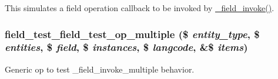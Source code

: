 This simulates a field operation callback to be invoked by \hyperlink{group__field__attach_ga65f891a5eea6513f8505f5cfc5894896}{\_\-field\_\-invoke()}. \hypertarget{field__test_8module_a9bd2f4a0811ce446841803c46aa58517}{
\subsubsection[{field\_\-test\_\-field\_\-test\_\-op\_\-multiple}]{\setlength{\rightskip}{0pt plus 5cm}field\_\-test\_\-field\_\-test\_\-op\_\-multiple (\$ {\em entity\_\-type}, \/  \$ {\em entities}, \/  \$ {\em field}, \/  \$ {\em instances}, \/  \$ {\em langcode}, \/  \&\$ {\em items})}}
\label{field__test_8module_a9bd2f4a0811ce446841803c46aa58517}
Generic op to test \_\-field\_\-invoke\_\-multiple behavior.

